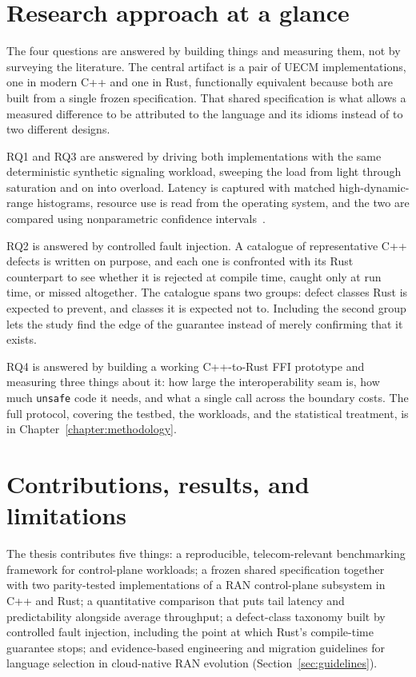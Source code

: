 \documentclass[english,twoside,openright,a4paper,censored,csm,software-track-2020]{HYthesisML}
\begin{document}
\section{Research approach at a glance}
The four questions are answered by building things and measuring them, not by surveying the
literature. The central artifact is a pair of UECM implementations, one in modern C++ and one
in Rust, functionally equivalent because both are built from a single frozen specification.
That shared specification is what allows a measured difference to be attributed to the language
and its idioms instead of to two different designs.

RQ1 and RQ3 are answered by driving both implementations with the same deterministic synthetic
signaling workload, sweeping the load from light through saturation and on into overload.
Latency is captured with matched high-dynamic-range histograms, resource use is read from the
operating system, and the two are compared using nonparametric confidence
intervals~\cite{georges2007rigorous}.

RQ2 is answered by controlled fault injection. A catalogue of representative C++ defects is
written on purpose, and each one is confronted with its Rust counterpart to see whether it is
rejected at compile time, caught only at run time, or missed altogether. The catalogue spans
two groups: defect classes Rust is expected to prevent, and classes it is expected not to.
Including the second group lets the study find the edge of the guarantee instead of
merely confirming that it exists.

RQ4 is answered by building a working C++-to-Rust FFI prototype and measuring three things
about it: how large the interoperability seam is, how much \texttt{unsafe} code it needs, and
what a single call across the boundary costs. The full protocol, covering the testbed, the
workloads, and the statistical treatment, is in Chapter~\ref{chapter:methodology}.

\section{Contributions, results, and limitations}
The thesis contributes five things: a reproducible, telecom-relevant benchmarking framework for
control-plane workloads; a frozen shared specification together with two parity-tested
implementations of a RAN control-plane subsystem in C++ and Rust; a quantitative comparison
that puts tail latency and predictability alongside average throughput; a defect-class taxonomy
built by controlled fault injection, including the point at which Rust's compile-time guarantee
stops; and evidence-based engineering and migration guidelines for language selection in
cloud-native RAN evolution (Section~\ref{sec:guidelines}).
\end{document}

